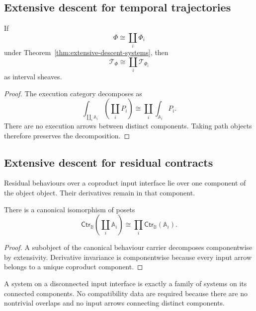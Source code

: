 \subsection{Extensive descent for temporal trajectories}
\label{subsec:extensive-descent-trajectories}

\begin{proposition}
\label{prop:temporal-trajectories-coproduct}
If
\[
    \Phi
    \cong
    \coprod_i\Phi_i
\]
under Theorem~\ref{thm:extensive-descent-systems}, then
\[
    \mathscr T_\Phi
    \cong
    \coprod_i\mathscr T_{\Phi_i}
\]
as interval sheaves.
\end{proposition}

\begin{proof}
The execution category decomposes as
\[
    \int_{\coprod_i\mathbb A_i}
    \left(\coprod_iP_i\right)
    \cong
    \coprod_i
    \int_{\mathbb A_i}P_i.
\]
There are no execution arrows between distinct components. Taking path
objects therefore preserves the decomposition.
\end{proof}

\subsection{Extensive descent for residual contracts}
\label{subsec:extensive-descent-contracts}

Residual behaviours over a coproduct input interface lie over one component
of the object object. Their derivatives remain in that component.

\begin{theorem}
\label{thm:extensive-descent-contracts}
There is a canonical isomorphism of posets
\[
    \mathsf{Ctr}_{\mathbb B}
    \left(
    \coprod_i\mathbb A_i
    \right)
    \cong
    \prod_i
    \mathsf{Ctr}_{\mathbb B}(\mathbb A_i).
\]
\end{theorem}

\begin{proof}
A subobject of the canonical behaviour carrier decomposes componentwise by
extensivity. Derivative invariance is componentwise because every input arrow
belongs to a unique coproduct component.
\end{proof}

\begin{remark}
\label{rem:extensive-descent-systems-interpretation}
A system on a disconnected input interface is exactly a family of systems on
its connected components. No compatibility data are required because there
are no nontrivial overlaps and no input arrows connecting distinct
components.
\end{remark}

